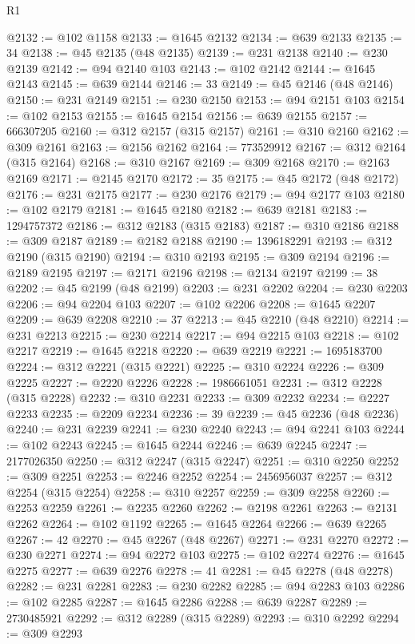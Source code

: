\begin{lexlean}{R1}
\begin{coremodule}
@2132 := @102 @1158
@2133 := @1645 @2132
@2134 := @639 @2133
@2135 := 34
@2138 := @45 @2135 (@48 @2135)
@2139 := @231 @2138
@2140 := @230 @2139
@2142 := @94 @2140 @103
@2143 := @102 @2142
@2144 := @1645 @2143
@2145 := @639 @2144
@2146 := 33
@2149 := @45 @2146 (@48 @2146)
@2150 := @231 @2149
@2151 := @230 @2150
@2153 := @94 @2151 @103
@2154 := @102 @2153
@2155 := @1645 @2154
@2156 := @639 @2155
@2157 := 666307205
@2160 := @312 @2157 (@315 @2157)
@2161 := @310 @2160
@2162 := @309 @2161
@2163 := @2156 @2162
@2164 := 773529912
@2167 := @312 @2164 (@315 @2164)
@2168 := @310 @2167
@2169 := @309 @2168
@2170 := @2163 @2169
@2171 := @2145 @2170
@2172 := 35
@2175 := @45 @2172 (@48 @2172)
@2176 := @231 @2175
@2177 := @230 @2176
@2179 := @94 @2177 @103
@2180 := @102 @2179
@2181 := @1645 @2180
@2182 := @639 @2181
@2183 := 1294757372
@2186 := @312 @2183 (@315 @2183)
@2187 := @310 @2186
@2188 := @309 @2187
@2189 := @2182 @2188
@2190 := 1396182291
@2193 := @312 @2190 (@315 @2190)
@2194 := @310 @2193
@2195 := @309 @2194
@2196 := @2189 @2195
@2197 := @2171 @2196
@2198 := @2134 @2197
@2199 := 38
@2202 := @45 @2199 (@48 @2199)
@2203 := @231 @2202
@2204 := @230 @2203
@2206 := @94 @2204 @103
@2207 := @102 @2206
@2208 := @1645 @2207
@2209 := @639 @2208
@2210 := 37
@2213 := @45 @2210 (@48 @2210)
@2214 := @231 @2213
@2215 := @230 @2214
@2217 := @94 @2215 @103
@2218 := @102 @2217
@2219 := @1645 @2218
@2220 := @639 @2219
@2221 := 1695183700
@2224 := @312 @2221 (@315 @2221)
@2225 := @310 @2224
@2226 := @309 @2225
@2227 := @2220 @2226
@2228 := 1986661051
@2231 := @312 @2228 (@315 @2228)
@2232 := @310 @2231
@2233 := @309 @2232
@2234 := @2227 @2233
@2235 := @2209 @2234
@2236 := 39
@2239 := @45 @2236 (@48 @2236)
@2240 := @231 @2239
@2241 := @230 @2240
@2243 := @94 @2241 @103
@2244 := @102 @2243
@2245 := @1645 @2244
@2246 := @639 @2245
@2247 := 2177026350
@2250 := @312 @2247 (@315 @2247)
@2251 := @310 @2250
@2252 := @309 @2251
@2253 := @2246 @2252
@2254 := 2456956037
@2257 := @312 @2254 (@315 @2254)
@2258 := @310 @2257
@2259 := @309 @2258
@2260 := @2253 @2259
@2261 := @2235 @2260
@2262 := @2198 @2261
@2263 := @2131 @2262
@2264 := @102 @1192
@2265 := @1645 @2264
@2266 := @639 @2265
@2267 := 42
@2270 := @45 @2267 (@48 @2267)
@2271 := @231 @2270
@2272 := @230 @2271
@2274 := @94 @2272 @103
@2275 := @102 @2274
@2276 := @1645 @2275
@2277 := @639 @2276
@2278 := 41
@2281 := @45 @2278 (@48 @2278)
@2282 := @231 @2281
@2283 := @230 @2282
@2285 := @94 @2283 @103
@2286 := @102 @2285
@2287 := @1645 @2286
@2288 := @639 @2287
@2289 := 2730485921
@2292 := @312 @2289 (@315 @2289)
@2293 := @310 @2292
@2294 := @309 @2293

\end{coremodule}
\end{lexlean}
